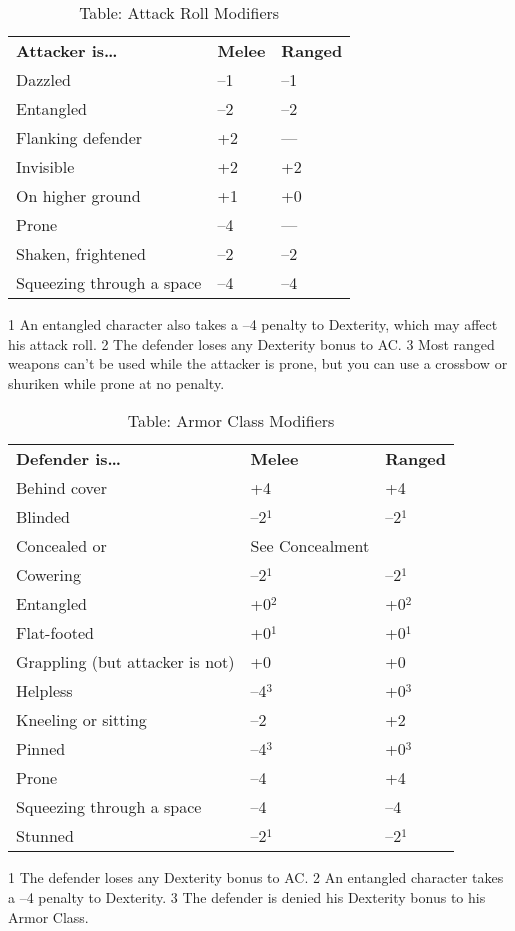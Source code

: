 \begin{table}[]
\sffamily
\caption{Table: Attack Roll Modifiers}
\begin{tabular}{lll}
\textbf{Attacker is…} & \textbf{Melee} & \textbf{Ranged}\\
Dazzled & --1 & --1\\
Entangled & --2 & --2\\
Flanking defender & +2 & —\\
Invisible & +2 & +2\\
On higher ground & +1 & +0\\
Prone & --4 & —\\
Shaken, frightened & --2 & --2\\
Squeezing through a space & --4 & --4\\
\end{tabular}
1 An entangled character also takes a --4 penalty to Dexterity, which may affect his attack roll.
2 The defender loses any Dexterity bonus to AC.
3 Most ranged weapons can't be used while the attacker is prone, but you can use a crossbow or shuriken while prone at no penalty.
\end{table}
\begin{table}[]
\sffamily
\caption{Table: Armor Class Modifiers}
\begin{tabular}{lll}
\textbf{Defender is…} & \textbf{Melee} & \textbf{Ranged}\\
Behind cover & +4 & +4\\
Blinded & --2\(^{1}\) & --2\(^{1}\)\\
Concealed or  & See Concealment\\
Cowering & --2\(^{1}\) & --2\(^{1}\)\\
Entangled & +0\(^{2}\) & +0\(^{2}\)\\
Flat-footed & +0\(^{1}\) & +0\(^{1}\)\\
Grappling (but attacker is not) & +0 & +0\\
Helpless & --4\(^{3}\) & +0\(^{3}\)\\
Kneeling or sitting & --2 & +2\\
Pinned & --4\(^{3}\) & +0\(^{3}\)\\
Prone & --4 & +4\\
Squeezing through a space & --4 & --4\\
Stunned & --2\(^{1}\) & --2\(^{1}\)\\
\end{tabular}
1 The defender loses any Dexterity bonus to AC.
2 An entangled character takes a --4 penalty to Dexterity.
3 The defender is denied his Dexterity bonus to his Armor Class.
\end{table}

